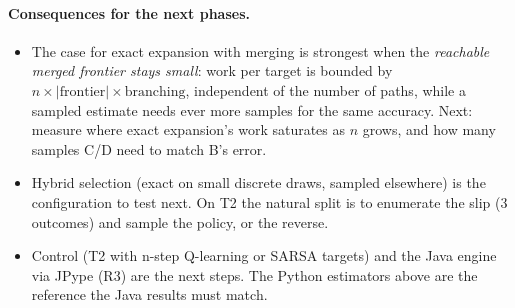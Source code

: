 \paragraph{Consequences for the next phases.}
\begin{itemize}
\item The case for exact expansion with merging is strongest when the \emph{reachable merged frontier stays small}:
  work per target is bounded by $n \times |\text{frontier}| \times \text{branching}$, independent of the number of paths,
  while a sampled estimate needs ever more samples for the same accuracy. Next: measure where exact expansion's work
  saturates as $n$ grows, and how many samples C/D need to match B's error.
\item Hybrid selection (exact on small discrete draws, sampled elsewhere) is the configuration to test next. On T2 the
  natural split is to enumerate the slip (3 outcomes) and sample the policy, or the reverse.
\item Control (T2 with n-step Q-learning or SARSA targets) and the Java engine via JPype (R3) are the next steps. The
  Python estimators above are the reference the Java results must match.
\end{itemize}

